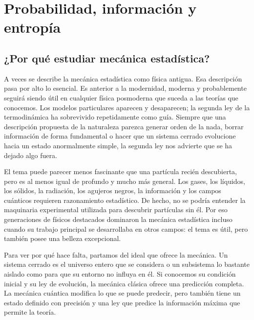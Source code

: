 \chapter{Probabilidad, información y entropía}


\section{¿Por qué estudiar mecánica estadística?}

A veces se describe la mecánica estadística como física antigua. Esa descripción pasa por alto lo esencial. Es anterior a la modernidad, moderna y probablemente seguirá siendo útil en cualquier física posmoderna que suceda a las teorías que conocemos. Los modelos particulares aparecen y desaparecen; la segunda ley de la termodinámica ha sobrevivido repetidamente como guía. Siempre que una descripción propuesta de la naturaleza parezca generar orden de la nada, borrar información de forma fundamental o hacer que un sistema cerrado evolucione hacia un estado anormalmente simple, la segunda ley nos advierte que se ha dejado algo fuera.

El tema puede parecer menos fascinante que una partícula recién descubierta, pero es al menos igual de profundo y mucho más general. Los gases, los líquidos, los sólidos, la radiación, los agujeros negros, la información y los campos cuánticos requieren razonamiento estadístico. De hecho, no se podría entender la maquinaria experimental utilizada para descubrir partículas sin él. Por eso generaciones de físicos destacados dominaron la mecánica estadística incluso cuando su trabajo principal se desarrollaba en otros campos: el tema es útil, pero también posee una belleza excepcional.

Para ver por qué hace falta, partamos del ideal que ofrece la mecánica. Un sistema cerrado es el universo entero que se considera o un subsistema lo bastante aislado como para que su entorno no influya en él. Si conocemos su condición inicial y su ley de evolución, la mecánica clásica ofrece una predicción completa. La mecánica cuántica modifica lo que se puede predecir, pero también tiene un estado definido con precisión y una ley que predice la información máxima que permite la teoría.

